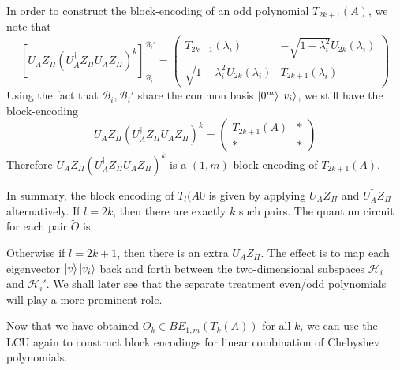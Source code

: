 \documentclass[12pt, oneside]{book}
\theoremstyle{definition}
\theoremstyle{definition}
\theoremstyle{remark}
\begin{document}
In order to construct the block-encoding of an odd polynomial $T_{2k+1}(A)$, we note that
\[
[U_AZ_{\Pi} (U_A^{\dagger}Z_{\Pi}U_AZ_{\Pi})^k]_{\mathcal{B}_i}^{\mathcal{B}_i'} = \begin{pmatrix} T_{2k+1}(\lambda_i) & -\sqrt{1-\lambda_i^2}U_{2k}(\lambda_i) \\ \sqrt{1-\lambda_i^2}U_{2k}(\lambda_i) & T_{2k+1}(\lambda_i) \end{pmatrix}
\]
Using the fact that $\mathcal{B}_i,\mathcal{B}_i'$ share the common basis $\ket{0^m}\ket{v_i}$, we still have the block-encoding
\[
U_AZ_{\Pi}(U_A^{\dagger}Z_{\Pi}U_AZ_{\Pi})^k = \begin{pmatrix} T_{2k+1}(A) & * \\ * & * \end{pmatrix}
\]
Therefore $U_AZ_{\Pi}(U_A^{\dagger}Z_{\Pi}U_AZ_{\Pi})^k$ is a $(1,m)$-block encoding of $T_{2k+1}(A)$.

In summary, the block encoding of $T_l(A0$ is given by applying $U_AZ_{\Pi}$ and $U_A^{\dagger}Z_{\Pi}$ alternatively. If $l=2k$, then there are exactly $k$ such pairs. The quantum circuit for each pair $\tilde{O}$ is


Otherwise if $l=2k+1$, then there is an extra $U_AZ_{\Pi}$. The effect is to map each eigenvector $\ket{v}\ket{v_i}$ back and forth between the two-dimensional subspaces $\mathcal{H}_i$ and $\mathcal{H}_i'$. We shall later see that the separate treatment even/odd polynomials will play a more prominent role.

Now that we have obtained $O_k \in BE_{1,m}(T_k(A))$ for all $k$, we can use the LCU again to construct block encodings for linear combination of Chebyshev polynomials.
\end{document}
